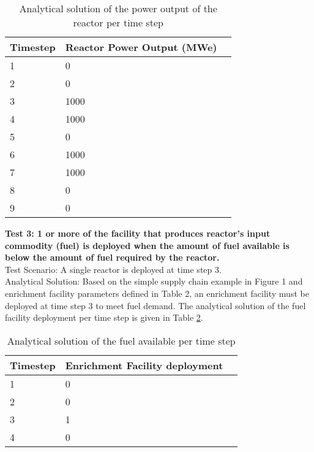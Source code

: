 \documentclass[12pt,letterpaper]{article}
\begin{document}
\begin{table}[H]
     \centering
    \begin{tabularx}{\textwidth}{bbb}
       \hline
       Timestep & Reactor Power Output (MWe) \\
       \hline
       1 & 0 \\
       2 & 0 \\
       3 & 1000 \\
       4 & 1000 \\
       5 & 0 \\
       6 & 1000 \\
       7 & 1000 \\
       8 & 0 \\
       9 & 0 \\
       \hline
    \end{tabularx}
    \caption {Analytical solution of the power output of the reactor per time step}
    \label{tab:cycles}
\end{table}

\noindent
\textbf{Test 3: 1 or more of the facility that produces reactor’s input commodity (fuel) is deployed when the amount of fuel available is below the amount of fuel required by the reactor.} \\
Test Scenario: A single reactor is deployed at time step 3.\\
Analytical Solution: Based on the simple supply chain example in Figure 1 and enrichment facility parameters defined in Table 2, an enrichment facility must be deployed at time step 3 to meet fuel demand. The analytical solution of the fuel facility deployment per time step is given in Table \ref{tab:fuel}.

\begin{table}[H]
     \centering
    \begin{tabularx}{\textwidth}{bbb}
       \hline
       Timestep & Enrichment Facility deployment  \\
       \hline
       1 & 0 \\
       2 & 0 \\
       3 & 1\\
       4 & 0 \\
       \hline
    \end{tabularx}
    \caption {Analytical solution of the fuel available per time step}
    \label{tab:fuel}
\end{table}
\end{document}
